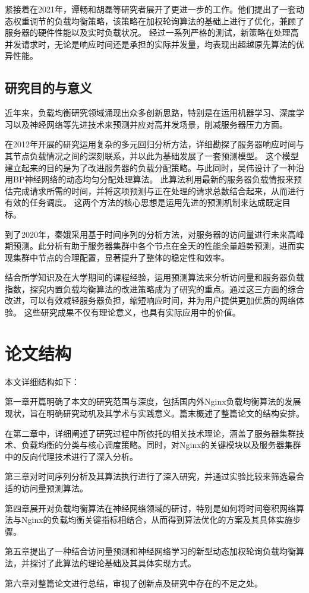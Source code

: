 紧接着在2021年，谭畅和胡磊等研究者展开了更进一步的工作\cite{谭畅2021云中心基于}。他们提出了一套动态权重调节的负载均衡策略，该策略在加权轮询算法的基础上进行了优化，兼顾了服务器的硬件性能以及实时负载状况。
经过一系列严格的测试，新策略在处理高并发请求时，无论是响应时间还是承担的实际并发量，均表现出超越原先算法的优异性能。

\subsection{研究目的与意义}

近年来，负载均衡研究领域涌现出众多创新思路，特别是在运用机器学习、深度学习以及神经网络等先进技术来预测并应对高并发场景，削减服务器压力方面。

在2012年开展的研究运用复杂的多元回归分析方法，详细勘探了服务器响应时间与其节点负载情况之间的深刻联系，并以此为基础发展了一套预测模型。
这个模型建立起来的目的是为了改进服务器的负载分配策略。与此同时，吴伟设计了一种沿用BP神经网络的动态均匀分配处理算法。
此算法利用最新的服务器负载情报来预估完成请求所需的时间，并将这项预测与正在处理的请求总数结合起来，从而进行有效的任务调度。
这两个方法的核心思想是运用先进的预测机制来达成既定目标。

到了2020年，秦娥采用基于时间序列的分析方法，对服务器的访问量进行未来高峰期预测\cite{qbee}。此分析有助于服务器集群中各个节点在全天的性能余量趋势预测，进而实现集群中节点的合理配置，显著提升了整体的稳定性和效率。

结合所学知识及在大学期间的课程经验，运用预测算法来分析访问量和服务器负载指数，探究内置负载均衡算法的改进策略成为了研究的重点。通过这三方面的综合改进，可以有效减轻服务器负担，缩短响应时间，并为用户提供更加优质的网络体验。
这些研究成果不仅有理论意义，也具有实际应用中的价值。
\section{论文结构}

本文详细结构如下：

第一章开篇明确了本文的研究范围与深度，包括国内外Nginx负载均衡算法的发展现状，旨在明确研究动机及其学术与实践意义。篇末概述了整篇论文的结构安排。

在第二章中，详细阐述了研究过程中所依托的相关技术理论，涵盖了服务器集群技术、负载均衡的分类与核心调度策略。同时，对Nginx的关键模块以及服务器集群中的反向代理技术进行了深入分析。

第三章对时间序列分析及其算法执行进行了深入研究，并通过实验比较来筛选最合适的访问量预测算法。

第四章展开对负载均衡算法在神经网络领域的研讨，特别是如何将时间卷积网络算法与Nginx的负载均衡关键指标相结合，从而得到算法优化的方案及其具体实施步骤。

第五章提出了一种结合访问量预测和神经网络学习的新型动态加权轮询负载均衡算法，并探讨了此算法的理论基础及其具体实现方式。

第六章对整篇论文进行总结，审视了创新点及研究中存在的不足之处。
